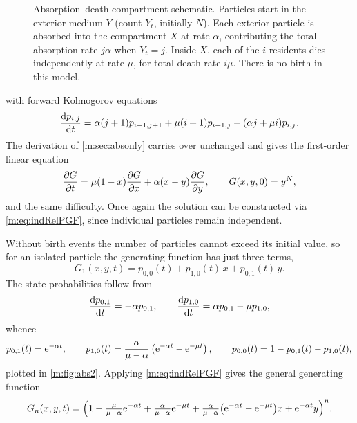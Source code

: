 \begin{figure}[ht]
\caption{Absorption--death compartment schematic. Particles start in the exterior
medium $Y$ (count $Y_t$, initially $N$). Each exterior particle is absorbed into the
compartment $X$ at rate $\alpha$, contributing the total absorption rate $j\alpha$
when $Y_t=j$. Inside $X$, each of the $i$ residents dies independently at rate
$\mu$, for total death rate $i\mu$. There is no birth in this model.}
\label{m:fig:abs-compartment}
\end{figure}

with forward Kolmogorov equations
\begin{equation}
\label{m:eq:FK2}
\frac{\mathrm{d} p_{i,j}}{\mathrm{d} t} = \alpha(j+1)p_{i-1,j+1} + \mu(i+1)p_{i+1,j} - (\alpha j+\mu i)p_{i,j} .
\end{equation}
The derivation of \cref{m:sec:absonly} carries over unchanged and gives the
first-order linear equation
\begin{equation}
\label{m:eq:PDE2}
\frac{\partial G}{\partial t} = \mu(1-x)\frac{\partial G}{\partial x} + \alpha(x-y)\frac{\partial G}{\partial y},
\qquad G(x,y,0) = y^N ,
\end{equation}
and the same difficulty. Once again the solution can be constructed via
\cref{m:eq:indRelPGF}, since individual particles remain independent.

Without birth events the number of particles cannot exceed its initial value, so
for an isolated particle the generating function has just three terms,
\begin{equation*}
G_1(x,y,t) = p_{0,0}(t) + p_{1,0}(t)\,x + p_{0,1}(t)\,y .
\end{equation*}
The state probabilities follow from
\begin{equation*}
\frac{\mathrm{d} p_{0,1}}{\mathrm{d} t} = -\alpha p_{0,1},
\qquad
\frac{\mathrm{d} p_{1,0}}{\mathrm{d} t} = \alpha p_{0,1} - \mu p_{1,0},
\end{equation*}
whence
\begin{equation}
\label{m:eq:absdeathstates}
p_{0,1}(t) = \mathrm{e}^{-\alpha t},
\qquad
p_{1,0}(t) = \frac{\alpha}{\mu-\alpha}\left(\mathrm{e}^{-\alpha t}-\mathrm{e}^{-\mu t}\right),
\qquad
p_{0,0}(t) = 1-p_{0,1}(t)-p_{1,0}(t),
\end{equation}
plotted in \cref{m:fig:abs2}. Applying \cref{m:eq:indRelPGF} gives the general
generating function
\begin{equation}
\label{m:eq:Gabsdeath}
G_n(x,y,t) = \Bigl(
1-\tfrac{\mu}{\mu-\alpha}\mathrm{e}^{-\alpha t} + \tfrac{\alpha}{\mu-\alpha}\mathrm{e}^{-\mu t}
+ \tfrac{\alpha}{\mu-\alpha}\bigl(\mathrm{e}^{-\alpha t}-\mathrm{e}^{-\mu t}\bigr)x
+ \mathrm{e}^{-\alpha t}y\Bigr)^n .
\end{equation}

